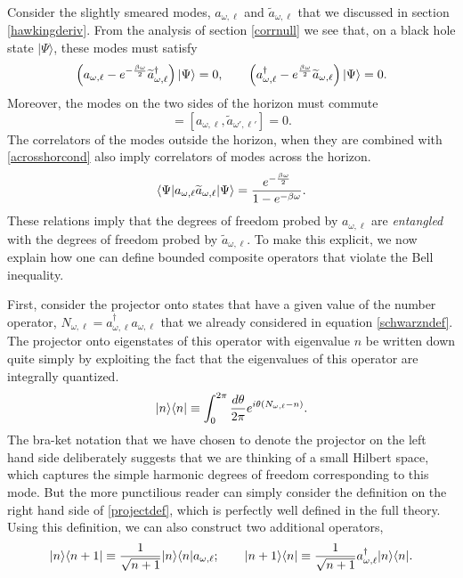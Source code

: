 \documentclass[12pt]{article}
\def\schwarzn{N}
\newcommand{\cop}[1]{#1}
\def\ta{\widetilde{\cop{a}}}
\newcommand{\be}{\begin{equation}}
\newcommand{\ee}{\end{equation}}
\begin{document}
Consider the slightly smeared modes, $a_{\omega, \ell}$ and $\ta_{\omega, \ell}$ that we discussed in section \ref{hawkingderiv}. From the analysis of section \ref{corrnull} we see that, on a black hole state $|\Psi \rangle$, these modes must satisfy
\be
\label{acrosshorcond}
\left(a_{\omega, \ell}  - e^{-{\beta \omega \over 2}} \ta_{\omega, \ell}^{\dagger}\right)|\Psi \rangle = 0, \qquad
\left( a_{\omega, \ell}^{\dagger} - e^{ {\beta \omega \over 2}} \ta_{\omega, \ell} \right) |\Psi \rangle = 0.
\ee
Moreover, the modes on the two sides of the horizon must commute
\be
[a_{\omega, \ell}, \ta_{\omega', \ell'}^{\dagger}] = [a_{\omega, \ell}, \ta_{\omega', \ell'}] = 0.
\ee
The correlators of the modes outside the horizon, when they are combined with \eqref{acrosshorcond} also imply
correlators of modes across the horizon.
\be
\label{acrosshorcorr}
\langle \Psi | a_{\omega, \ell}  \ta_{\omega, \ell} |\Psi \rangle = {e^{-{\beta \omega \over 2}} \over 1 - e^{-\beta \omega}}.
\ee
These relations imply that the degrees of freedom probed by $a_{\omega, \ell}$ are {\em entangled} with the degrees of freedom probed by $\ta_{\omega, \ell}$.  To make this explicit, we now explain how one can define bounded composite operators that violate the Bell inequality.

First, consider the projector onto states that have a given value of the number operator, $\schwarzn_{\omega, \ell} = a_{\omega, \ell}^{\dagger} a_{\omega, \ell}$ that we already considered in equation \eqref{schwarzndef}. The projector onto eigenstates of this operator with eigenvalue $n$  be written down quite simply by exploiting the fact that the eigenvalues of this operator are integrally quantized.
\be
\label{projectdef}
|n \rangle \langle n | \equiv \int_0^{2 \pi} {d \theta \over 2 \pi} e^{i \theta (\schwarzn_{\omega, \ell} - n)}.
\ee
The bra-ket notation that we have chosen to denote the projector on the left hand side deliberately suggests that we are thinking of a small Hilbert space, which captures the simple harmonic degrees of freedom corresponding to this mode. But the more punctilious reader can simply consider the definition on the right hand side of \eqref{projectdef}, which is perfectly well defined in the full theory. Using this definition, we can also construct two additional operators,
\be
\label{raiselowerdef}
|n \rangle \langle n+1| \equiv  {1 \over \sqrt{n+1}} |n \rangle \langle n | a_{\omega, \ell}; \qquad
|n + 1\rangle \langle n| \equiv  {1 \over \sqrt{n+1}} a_{\omega, \ell}^{\dagger} |n \rangle \langle n |.
\ee
\end{document}
